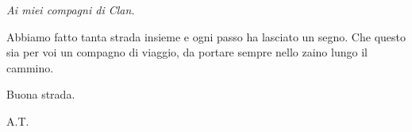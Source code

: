 \paginadestra
\thispagestyle{empty}
\vspace*{\fill}
\begin{flushright}
  \begin{minipage}{0.62\textwidth}
    \raggedleft\itshape\large
    Ai miei compagni di Clan.\par
    \vspace{5mm}
    \normalsize
    Abbiamo fatto tanta strada insieme e ogni passo ha lasciato un segno.
    Che questo sia per voi un compagno di viaggio, da portare sempre nello zaino lungo il cammino.\par
    \vspace{6mm}
    Buona strada.\par
    \vspace{3mm}
    \upshape A.T.
  \end{minipage}
  \end{flushright}
